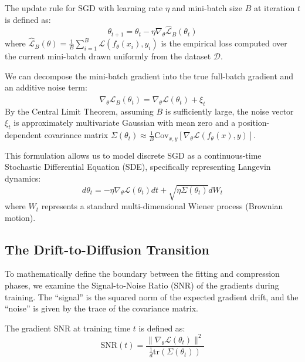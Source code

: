 The update rule for SGD with learning rate $\eta$ and mini-batch size $B$ at iteration $t$ is defined as:
\begin{equation}
    \theta_{t+1} = \theta_t - \eta \nabla_\theta \hat{\mathcal{L}}_B(\theta_t)
\end{equation}
where $\hat{\mathcal{L}}_B(\theta) = \frac{1}{B} \sum_{i=1}^B \mathcal{L}(f_\theta(x_i), y_i)$ is the empirical loss computed over the current mini-batch drawn uniformly from the dataset $\mathcal{D}$. 

We can decompose the mini-batch gradient into the true full-batch gradient and an additive noise term:
\begin{equation}
    \nabla_\theta \hat{\mathcal{L}}_B(\theta_t) = \nabla_\theta \mathcal{L}(\theta_t) + \xi_t
\end{equation}
By the Central Limit Theorem, assuming $B$ is sufficiently large, the noise vector $\xi_t$ is approximately multivariate Gaussian with mean zero and a position-dependent covariance matrix $\Sigma(\theta_t) \approx \frac{1}{B} \text{Cov}_{x,y}[\nabla_\theta \mathcal{L}(f_\theta(x), y)]$.

This formulation allows us to model discrete SGD as a continuous-time Stochastic Differential Equation (SDE), specifically representing Langevin dynamics:
\begin{equation}
    d\theta_t = -\eta \nabla_\theta \mathcal{L}(\theta_t) dt + \sqrt{\eta \Sigma(\theta_t)} dW_t
\end{equation}
where $W_t$ represents a standard multi-dimensional Wiener process (Brownian motion). 

\subsection{The Drift-to-Diffusion Transition}

To mathematically define the boundary between the fitting and compression phases, we examine the Signal-to-Noise Ratio (SNR) of the gradients during training. The ``signal'' is the squared norm of the expected gradient drift, and the ``noise'' is given by the trace of the covariance matrix.

\begin{definition}
    The gradient SNR at training time $t$ is defined as:
    \begin{equation}
        \text{SNR}(t) = \frac{\|\nabla_\theta \mathcal{L}(\theta_t)\|^2}{\frac{1}{d} \text{tr}(\Sigma(\theta_t))}
    \end{equation}
\end{definition}

